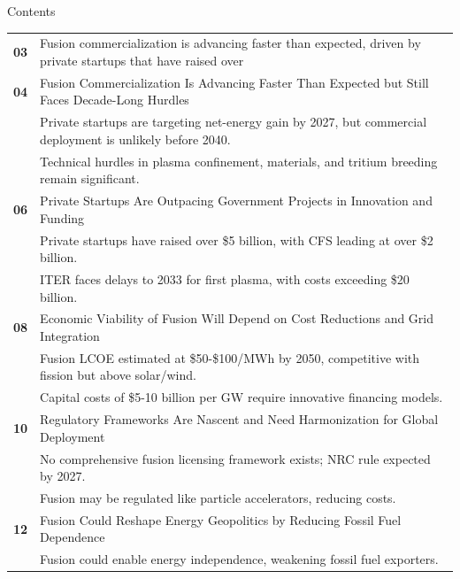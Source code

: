 \documentclass[10pt,a4paper]{article}
\begin{document}
\clearpage
{\sffamily\fontsize{26}{31}\selectfont\color{BONavy} Contents}\par\vspace{10pt}
\begin{tabularx}{\linewidth}{p{14mm}Y}
\textcolor{BOGreen}{\bfseries 03} & Fusion commercialization is advancing faster than expected, driven by private startups that have raised over \\[7pt]
\textcolor{BOGreen}{\bfseries 04} & Fusion Commercialization Is Advancing Faster Than Expected but Still Faces Decade-Long Hurdles \\[5pt]
 & {\scriptsize\color{BOMuted} Private startups are targeting net-energy gain by 2027, but commercial deployment is unlikely before 2040.} \\[1pt]
 & {\scriptsize\color{BOMuted} Technical hurdles in plasma confinement, materials, and tritium breeding remain significant.} \\[1pt]
\textcolor{BOGreen}{\bfseries 06} & Private Startups Are Outpacing Government Projects in Innovation and Funding \\[5pt]
 & {\scriptsize\color{BOMuted} Private startups have raised over \$5 billion, with CFS leading at over \$2 billion.} \\[1pt]
 & {\scriptsize\color{BOMuted} ITER faces delays to 2033 for first plasma, with costs exceeding \$20 billion.} \\[1pt]
\textcolor{BOGreen}{\bfseries 08} & Economic Viability of Fusion Will Depend on Cost Reductions and Grid Integration \\[5pt]
 & {\scriptsize\color{BOMuted} Fusion LCOE estimated at \$50-\$100/MWh by 2050, competitive with fission but above solar/wind.} \\[1pt]
 & {\scriptsize\color{BOMuted} Capital costs of \$5-10 billion per GW require innovative financing models.} \\[1pt]
\textcolor{BOGreen}{\bfseries 10} & Regulatory Frameworks Are Nascent and Need Harmonization for Global Deployment \\[5pt]
 & {\scriptsize\color{BOMuted} No comprehensive fusion licensing framework exists; NRC rule expected by 2027.} \\[1pt]
 & {\scriptsize\color{BOMuted} Fusion may be regulated like particle accelerators, reducing costs.} \\[1pt]
\textcolor{BOGreen}{\bfseries 12} & Fusion Could Reshape Energy Geopolitics by Reducing Fossil Fuel Dependence \\[5pt]
 & {\scriptsize\color{BOMuted} Fusion could enable energy independence, weakening fossil fuel exporters.} \\[1pt]

\end{tabularx}
\end{document}
